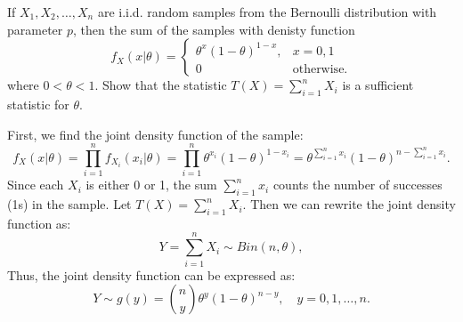 \begin{example}
    If $X_1, X_2, \ldots, X_n$ are i.i.d. random samples from the Bernoulli distribution with parameter $p$, then the sum of the samples
    with denisty function
    \[
        f_X(x|\theta) = \begin{cases} 
            \theta^x (1-\theta)^{1-x}, & x = 0, 1\\
            0 & \text{otherwise}.
        \end{cases}
    \]
    where $0 < \theta < 1$. Show that the statistic $T(X) = \sum_{i=1}^n X_i$ is a sufficient statistic for $\theta$.
\end{example}
\begin{solution}
    First, we find the joint density function of the sample:
    \[
        f_X(x|\theta) = \prod_{i=1}^n f_{X_i}(x_i|\theta) = \prod_{i=1}^n \theta^{x_i} (1-\theta)^{1-x_i} = \theta^{\sum_{i=1}^n x_i} (1-\theta)^{n - \sum_{i=1}^n x_i}.
    \]
    Since each $X_i$ is either 0 or 1, the sum $\sum_{i=1}^n x_i$ counts the number of successes (1s) in the sample. Let $T(X) = \sum_{i=1}^n X_i$. Then we can rewrite the joint density function as:
    \[
        Y = \sum_{i=1}^n X_i \sim Bin(n, \theta),
    \]
    Thus, the joint density function can be expressed as:
    \[
        Y \sim g(y) = {n \choose y} \theta^y (1-\theta)^{n-y}, \quad y = 0, 1, \ldots, n.
    \]
\end{solution}

